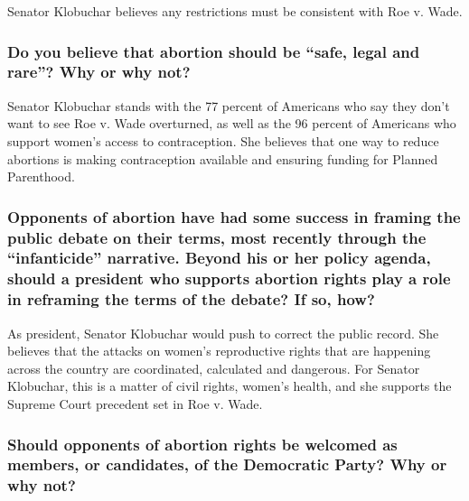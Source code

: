 Senator Klobuchar believes any restrictions must be consistent with Roe
v. Wade.

\hypertarget{do-you-believe-that-abortion-should-be-safe-legal-and-rare-why-or-why-not-3}{%
\subsubsection{Do you believe that abortion should be ``safe, legal and
rare''? Why or why
not?}\label{do-you-believe-that-abortion-should-be-safe-legal-and-rare-why-or-why-not-3}}

Senator Klobuchar stands with the 77 percent of Americans who say they
don't want to see Roe v. Wade overturned, as well as the 96 percent of
Americans who support women's access to contraception. She believes that
one way to reduce abortions is making contraception available and
ensuring funding for Planned Parenthood.

\hypertarget{opponents-of-abortion-have-had-some-success-in-framing-the-public-debate-on-their-terms-most-recently-through-the-infanticide-narrative-beyond-his-or-her-policy-agenda-should-a-president-who-supports-abortion-rights-play-a-role-in-reframing-the-terms-of-the-debate-if-so-how-3}{%
\subsubsection{Opponents of abortion have had some success in framing
the public debate on their terms, most recently through the
``infanticide'' narrative. Beyond his or her policy agenda, should a
president who supports abortion rights play a role in reframing the
terms of the debate? If so,
how?}\label{opponents-of-abortion-have-had-some-success-in-framing-the-public-debate-on-their-terms-most-recently-through-the-infanticide-narrative-beyond-his-or-her-policy-agenda-should-a-president-who-supports-abortion-rights-play-a-role-in-reframing-the-terms-of-the-debate-if-so-how-3}}

As president, Senator Klobuchar would push to correct the public record.
She believes that the attacks on women's reproductive rights that are
happening across the country are coordinated, calculated and dangerous.
For Senator Klobuchar, this is a matter of civil rights, women's health,
and she supports the Supreme Court precedent set in Roe v. Wade.

\hypertarget{should-opponents-of-abortion-rights-be-welcomed-as-members-or-candidates-of-the-democratic-party-why-or-why-not-3}{%
\subsubsection{Should opponents of abortion rights be welcomed as
members, or candidates, of the Democratic Party? Why or why
not?}\label{should-opponents-of-abortion-rights-be-welcomed-as-members-or-candidates-of-the-democratic-party-why-or-why-not-3}}

